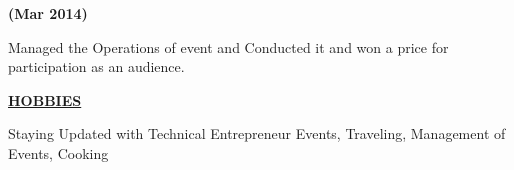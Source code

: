 \documentclass[letterpaper]{deedy-resume} %
\begin{document}
\begin{minipage}[t]{1.00\textwidth}
\hfill {\textbf{(Mar 2014)}}\\
\begin{tightitemize}
\item Managed the Operations of event and Conducted it and won a price for participation as an audience.
\end{tightitemize}

\minispace

{\uppercase\uline{\textbf{\large{Hobbies}}\hfill}\\}

\microspace
Staying Updated with Technical Entrepreneur Events, Traveling, Management of Events, Cooking 
\microspace


\end{minipage} %
\hfill








\end{document}
